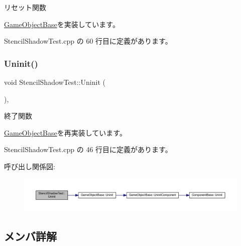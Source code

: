 リセット関数 



\mbox{\hyperlink{class_game_object_base_a85c59554f734bcb09f1a1e18d9517dce}{Game\+Object\+Base}}を実装しています。



 Stencil\+Shadow\+Test.\+cpp の 60 行目に定義があります。

\mbox{\label{class_stencil_shadow_test_a51b5d75aaba5673a13f950bd6b742720}} 
\subsubsection{\texorpdfstring{Uninit()}{Uninit()}}
{\footnotesize\ttfamily void Stencil\+Shadow\+Test\+::\+Uninit (\begin{DoxyParamCaption}{ }\end{DoxyParamCaption})\hspace{0.3cm}{\ttfamily [override]}, {\ttfamily [virtual]}}



終了関数 



\mbox{\hyperlink{class_game_object_base_a97e1bc277d7b1c0156d4735de29a022c}{Game\+Object\+Base}}を再実装しています。



 Stencil\+Shadow\+Test.\+cpp の 46 行目に定義があります。

呼び出し関係図\+:\nopagebreak
\begin{figure}[H]
\begin{center}
\leavevmode
\includegraphics[width=350pt]{class_stencil_shadow_test_a51b5d75aaba5673a13f950bd6b742720_cgraph}
\end{center}
\end{figure}


\subsection{メンバ詳解}
\mbox{\label{class_stencil_shadow_test_ac108faf317516a8335f73ca8005fbb20}} 

